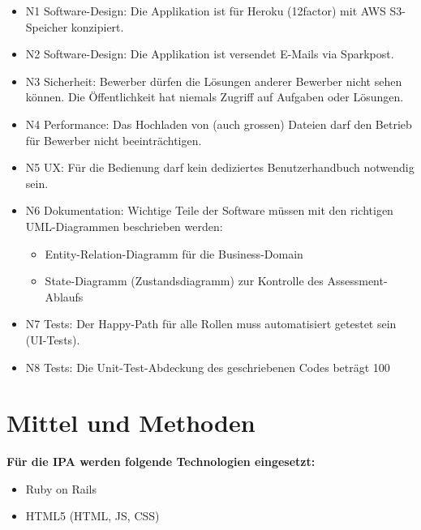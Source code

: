 \begin{itemize}
    \item N1 Software-Design: Die Applikation ist für Heroku (12factor) mit AWS S3-Speicher konzipiert.
    \item N2 Software-Design: Die Applikation ist versendet E-Mails via Sparkpost.
    \item N3 Sicherheit: Bewerber dürfen die Lösungen anderer Bewerber nicht sehen können. Die Öffentlichkeit hat niemals Zugriff auf Aufgaben oder Lösungen.
    \item N4 Performance: Das Hochladen von (auch grossen) Dateien darf den Betrieb für Bewerber nicht beeinträchtigen.
    \item N5 UX: Für die Bedienung darf kein dediziertes Benutzerhandbuch notwendig sein.
    \item N6 Dokumentation: Wichtige Teile der Software müssen mit den richtigen UML-Diagrammen beschrieben werden:
          \begin{itemize}
              \item Entity-Relation-Diagramm für die Business-Domain
              \item State-Diagramm (Zustandsdiagramm) zur Kontrolle des Assessment-Ablaufs
          \end{itemize}
    \item N7 Tests: Der Happy-Path für alle Rollen muss automatisiert getestet sein (UI-Tests).
    \item N8 Tests: Die Unit-Test-Abdeckung des geschriebenen Codes beträgt 100%
\end{itemize}

\section{Mittel und Methoden}

\textbf{Für die IPA werden folgende Technologien eingesetzt:}
\begin{itemize}
    \item Ruby on Rails
    \item HTML5 (HTML, JS, CSS)
\end{itemize}
